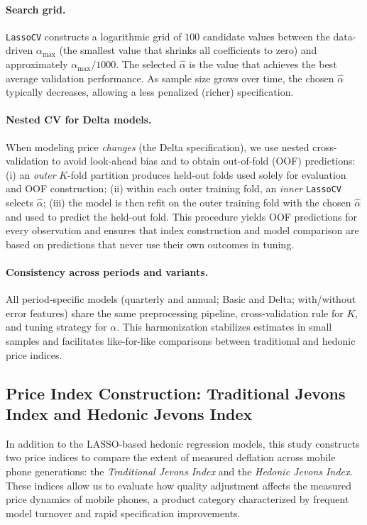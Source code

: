 \documentclass[12pt]{article}
\begin{document}
\paragraph{Search grid.}
\texttt{LassoCV} constructs a logarithmic grid of $100$ candidate values between the data-driven $\alpha_{\max}$ (the smallest value that shrinks all coefficients to zero) and approximately $\alpha_{\max}/1000$. The selected $\hat{\alpha}$ is the value that achieves the best average validation performance. As sample size grows over time, the chosen $\hat{\alpha}$ typically decreases, allowing a less penalized (richer) specification.

\paragraph{Nested CV for Delta models.}
When modeling price \emph{changes} (the Delta specification), we use nested cross-validation to avoid look-ahead bias and to obtain out-of-fold (OOF) predictions:
(i) an \emph{outer} $K$-fold partition produces held-out folds used solely for evaluation and OOF construction; 
(ii) within each outer training fold, an \emph{inner} \texttt{LassoCV} selects $\hat{\alpha}$; 
(iii) the model is then refit on the outer training fold with the chosen $\hat{\alpha}$ and used to predict the held-out fold.
This procedure yields OOF predictions for every observation and ensures that index construction and model comparison are based on predictions that never use their own outcomes in tuning.

\paragraph{Consistency across periods and variants.}
All period-specific models (quarterly and annual; Basic and Delta; with/without error features) share the same preprocessing pipeline, cross-validation rule for $K$, and tuning strategy for $\alpha$. This harmonization stabilizes estimates in small samples and facilitates like-for-like comparisons between traditional and hedonic price indices.


\subsection{Price Index Construction: Traditional Jevons Index and Hedonic Jevons Index}

In addition to the LASSO-based hedonic regression models, this study constructs two price indices to compare the extent of measured deflation across mobile phone generations: the \textit{Traditional Jevons Index} and the \textit{Hedonic Jevons Index}. These indices allow us to evaluate how quality adjustment affects the measured price dynamics of mobile phones, a product category characterized by frequent model turnover and rapid specification improvements.
\end{document}
